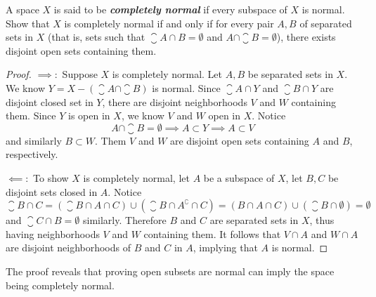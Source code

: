 \documentclass[12pt,a4paper]{article}
\begin{document}
    \begin{ex}
        A space $X$ is said to be \textbf{\textit{completely normal}} if every subspace of $X$ is normal. Show that $X$ is completely normal if and only if for every pair $A,B$ of separated sets in $X$ (that is, sets such that $\closure{A}\cap B=\emptyset$ and $A\cap\closure{B}=\emptyset$), there exists disjoint open sets containing them.
    \end{ex}
    \begin{proof}
        $\implies:$ Suppose $X$ is completely normal. Let $A,B$ be separated sets in $X$. We know $Y=X-(\closure{A}\cap \closure{B})$ is normal. Since $\closure{A}\cap Y$ and $\closure{B}\cap Y$ are disjoint closed set in $Y$, there are disjoint neighborhoods $V$ and $W$ containing them. Since $Y$ is open in $X$, we know $V$ and $W$ open in $X$. Notice 
        $$
        A\cap\closure{B}=\emptyset\implies A\subset Y\implies A\subset V
        $$
        and similarly $B\subset W$. Them $V$ and $W$ are disjoint open sets containing $A$ and $B$, respectively.
        \vspace{1em}

        $\impliedby:$ To show $X$ is completely normal, let $A$ be a subspace of $X$, let $B,C$ be disjoint sets closed in $A$. Notice 
        $$
        \closure{B}\cap C=(\closure{B}\cap A\cap C)\cup(\closure{B}\cap A^\complement\cap C)=(B\cap A\cap C)\cup(\closure{B}\cap\emptyset)=\emptyset
        $$
        and $\closure{C}\cap B=\emptyset$ similarly. Therefore $B$ and $C$ are separated sets in $X$, thus having neighborhoods $V$ and $W$ containing them. It follows that $V\cap A$ and $W\cap A$ are disjoint neighborhoods of $B$ and $C$ in $A$, implying that $A$ is normal.
    \end{proof}
    \begin{remark}
        The proof reveals that proving open subsets are normal can imply the space being completely normal.
    \end{remark}
    \hfill
\end{document}
